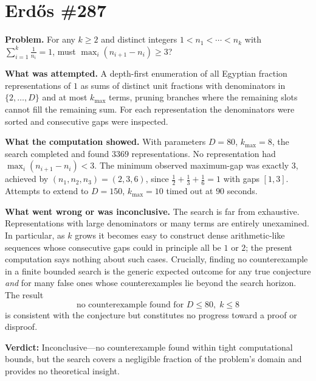 \section{Erdős \#287}

\textbf{Problem.} For any $k \geq 2$ and distinct integers $1 < n_1 < \cdots < n_k$ with $\sum_{i=1}^k \frac{1}{n_i} = 1$, must $\max_i(n_{i+1}-n_i) \geq 3$?

\textbf{What was attempted.} A depth-first enumeration of all Egyptian fraction representations of $1$ as sums of distinct unit fractions with denominators in $\{2,\dots,D\}$ and at most $k_{\max}$ terms, pruning branches where the remaining slots cannot fill the remaining sum. For each representation the denominators were sorted and consecutive gaps were inspected.

\textbf{What the computation showed.} With parameters $D = 80$, $k_{\max} = 8$, the search completed and found $3369$ representations. No representation had $\max_i(n_{i+1}-n_i) < 3$. The minimum observed maximum-gap was exactly $3$, achieved by $(n_1,n_2,n_3) = (2,3,6)$, since $\frac{1}{2}+\frac{1}{3}+\frac{1}{6}=1$ with gaps $[1,3]$. Attempts to extend to $D=150$, $k_{\max}=10$ timed out at $90$ seconds.

\textbf{What went wrong or was inconclusive.} The search is far from exhaustive. Representations with large denominators or many terms are entirely unexamined. In particular, as $k$ grows it becomes easy to construct dense arithmetic-like sequences whose consecutive gaps could in principle all be $1$ or $2$; the present computation says nothing about such cases. Crucially, finding no counterexample in a finite bounded search is the generic expected outcome for any true conjecture \emph{and} for many false ones whose counterexamples lie beyond the search horizon. The result
\begin{equation*}
    \text{no counterexample found for } D \leq 80,\; k \leq 8
\end{equation*}
is consistent with the conjecture but constitutes no progress toward a proof or disproof.

\textbf{Verdict:} Inconclusive---no counterexample found within tight computational bounds, but the search covers a negligible fraction of the problem's domain and provides no theoretical insight.